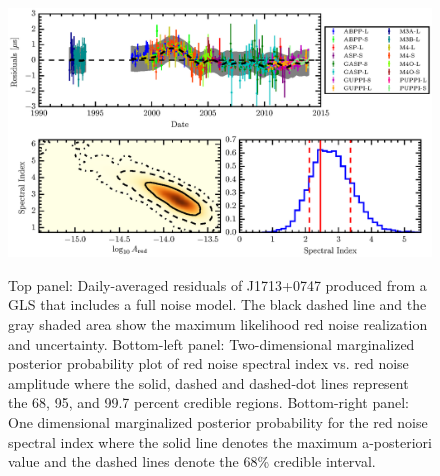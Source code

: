 \documentclass[12pt,preprint]{aastex}
\begin{document}
\begin{figure}
\includegraphics[scale=1.0]{1713_red.eps} \\ 
\caption{\label{fig:res} Top panel: Daily-averaged residuals of J1713+0747 produced from a GLS that includes a 
full noise model. The black dashed line and the gray shaded area show the maximum likelihood red noise
realization and uncertainty. Bottom-left panel: Two-dimensional marginalized posterior probability plot of red
noise spectral index vs. red noise amplitude where the solid, dashed and dashed-dot lines represent the 68, 95, and 99.7 percent credible regions. Bottom-right panel: One dimensional marginalized posterior probability for the red noise spectral index where the solid line denotes the maximum a-posteriori value and the dashed lines denote the 68\% credible interval.}
\end{figure} 
\end{document}
